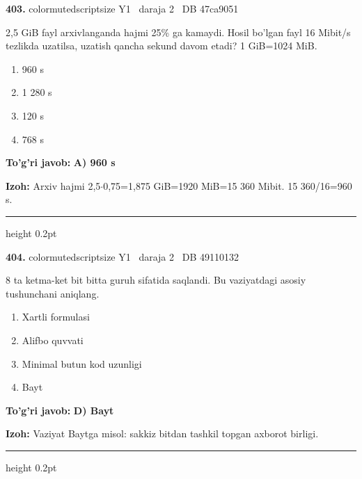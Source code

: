 \documentclass[10pt,a4paper,oneside]{article}
\begin{document}
\noindent\textbf{\color{ink}403.}  {color{muted}scriptsize Y1 \textbullet\ daraja 2 \textbullet\ DB 47ca9051}
\par
2,5 GiB fayl arxivlanganda hajmi 25\% ga kamaydi. Hosil bo'lgan fayl 16 Mibit/s tezlikda uzatilsa, uzatish qancha sekund davom etadi? 1 GiB=1024 MiB.
\begin{enumerate}[label=\Alph*),leftmargin=9mm]
\item 960 s
\item 1 280 s
\item 120 s
\item 768 s
\end{enumerate}
\begin{tcolorbox}[enhanced,breakable,colback=teal!4,colframe=teal!50!black,boxrule=0.5pt,arc=1.1mm,left=3mm,right=3mm,top=1.7mm,bottom=1.7mm,before skip=2mm,after skip=2mm]
\textbf{\color{teal}To'g'ri javob:} \textbf{A) 960 s}
\par\smallskip
\textbf{Izoh:} Arxiv hajmi 2,5\ensuremath{\cdot}0,75=1,875 GiB=1920 MiB=15 360 Mibit. 15 360/16=960 s.
\end{tcolorbox}
\vspace{2mm}\hrule height 0.2pt \vspace{3mm}

\noindent\textbf{\color{ink}404.}  {color{muted}scriptsize Y1 \textbullet\ daraja 2 \textbullet\ DB 49110132}
\par
8 ta ketma-ket bit bitta guruh sifatida saqlandi. Bu vaziyatdagi asosiy tushunchani aniqlang.
\begin{enumerate}[label=\Alph*),leftmargin=9mm]
\item Xartli formulasi
\item Alifbo quvvati
\item Minimal butun kod uzunligi
\item Bayt
\end{enumerate}
\begin{tcolorbox}[enhanced,breakable,colback=teal!4,colframe=teal!50!black,boxrule=0.5pt,arc=1.1mm,left=3mm,right=3mm,top=1.7mm,bottom=1.7mm,before skip=2mm,after skip=2mm]
\textbf{\color{teal}To'g'ri javob:} \textbf{D) Bayt}
\par\smallskip
\textbf{Izoh:} Vaziyat Baytga misol: sakkiz bitdan tashkil topgan axborot birligi.
\end{tcolorbox}
\vspace{2mm}\hrule height 0.2pt \vspace{3mm}
\end{document}
